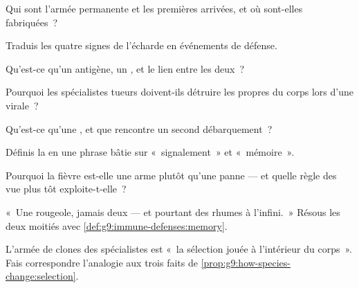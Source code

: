\begin{exercise}[$\star$]\label{exo:g9:immune-defenses:1}
Qui sont l'armée permanente et les premières arrivées, et
où sont-elles fabriquées~?
\end{exercise}

\begin{exercise}[$\star$]\label{exo:g9:immune-defenses:2}
Traduis les quatre signes de l'écharde en événements de
défense.
\end{exercise}

\begin{exercise}[$\star$]\label{exo:g9:immune-defenses:3}
Qu'est-ce qu'un antigène, un , et le lien entre les
deux~?
\end{exercise}

\begin{exercise}[$\star$]\label{exo:g9:immune-defenses:4}
Pourquoi les spécialistes tueurs doivent-ils détruire les
propres  du corps lors d'une  virale~?
\end{exercise}

\begin{exercise}[$\star$]\label{exo:g9:immune-defenses:5}
Qu'est-ce qu'une , et que rencontre un second
débarquement~?
\end{exercise}

\begin{exercise}[$\star$]\label{exo:g9:immune-defenses:6}
Définis la  en une phrase bâtie sur
«~signalement~» et «~mémoire~».
\end{exercise}

\begin{exercise}[$\star\star$]\label{exo:g9:immune-defenses:7}
Pourquoi la fièvre est-elle une arme plutôt qu'une panne ---
et quelle règle des  vue plus tôt exploite-t-elle~?
\end{exercise}

\begin{exercise}[$\star\star$]\label{exo:g9:immune-defenses:8}
«~Une rougeole, jamais deux --- et pourtant des rhumes à
l'infini.~» Résous les deux moitiés avec
\cref{def:g9:immune-defenses:memory}.
\end{exercise}

\begin{exercise}[$\star\star$]\label{exo:g9:immune-defenses:9}
L'armée de clones des spécialistes est «~la sélection jouée
à l'intérieur du corps~». Fais correspondre l'analogie aux
trois faits de
\cref{prop:g9:how-species-change:selection}.
\end{exercise}

